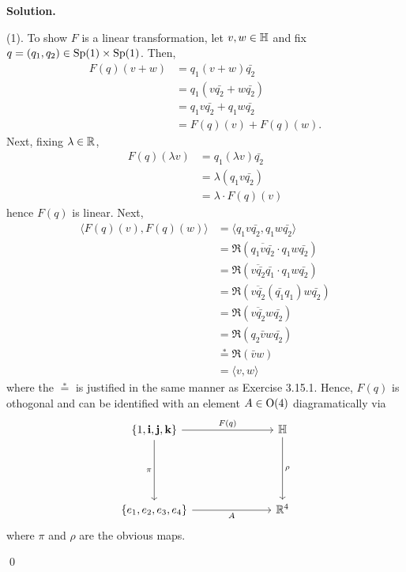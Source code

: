 \documentclass[12pt]{book}
\theoremstyle{definition}
\newenvironment{solution}
{%
  \par\noindent\textbf{Solution.}\quad
}
{%
  \qed\par
}
\begin{document}
\begin{solution}
  (1). To show $F$ is a linear transformation, let $v, w \in \mathbb{H}$ and fix $q = (q_1, q_2) \in \mathrm{Sp}(1) \times \mathrm{Sp}(1)$. 
  Then,
  \[
  \begin{aligned}
    F(q)(v+w) &= q_1(v+w)\bar{q_2} \\
              &= q_1(v\bar{q_2} + w\bar{q_2}) \\
              &= q_1v\bar{q_2} + q_1w\bar{q_2} \\
              &= F(q)(v) + F(q)(w).
  \end{aligned}
  \]
  Next, fixing $\lambda \in \mathbb{R}$, 
  \[
  \begin{aligned}
    F(q)(\lambda v) &= q_1(\lambda v)\bar{q_2} \\
                    &= \lambda(q_1v\bar{q_2}) \\
                    &= \lambda \cdot F(q)(v)
  \end{aligned}
  \]
  hence $F(q)$ is linear.
  Next,
  \[
  \begin{aligned}
    \langle F(q)(v), F(q)(w) \rangle &= \langle q_1v\bar{q_2}, q_1w\bar{q_2} \rangle \\
                                     &= \Re(\overline{q_1v\bar{q_2}} \cdot q_1w\bar{q_2}) \\
                                     &= \Re(\overline{v\bar{q_2}}\bar{q_1}\cdot q_1w\bar{q_2}) \\
                                     &= \Re(\overline{v\bar{q_2}}(\bar{q_1}q_1)w\bar{q_2}) \\
                                     &= \Re(\overline{v\bar{q_2}}w\bar{q_2}) \\
                                     &= \Re(q_2 \bar{v}w\bar{q_2}) \\
                                     &\stackrel{*}{=} \Re(\bar{v}w) \\
                                     &= \langle v, w \rangle 
  \end{aligned}
  \]    
  where the $\stackrel{*}{=}$ is justified in the same manner as Exercise 3.15.1.
  Hence, $F(q)$ is othogonal and can be identified with an element $A \in \mathrm{O}(4)$ diagramatically via 
  \[\begin{tikzcd}
    {\{1, \mathbf{i}, \mathbf{j}, \mathbf{k}\}} &&& \HH \\
    \\
    \\
    {\{e_1, e_2, e_3, e_4\}} &&& {\R^4}
    \arrow["{F(q)}", from=1-1, to=1-4]
    \arrow["\pi"', from=1-1, to=4-1]
    \arrow["{A}"', from=4-1, to=4-4]
    \arrow["\rho", from=1-4, to=4-4]
  \end{tikzcd}\]
  where $\pi$ and $\rho$ are the obvious maps.


\end{solution}
\end{document}
